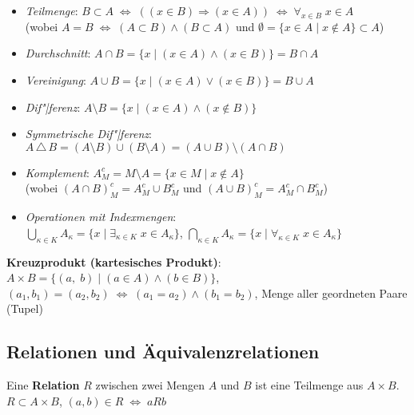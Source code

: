 \begin{itemize}
    \item \emph{Teilmenge}: $B \subset A \;\Leftrightarrow\;
    ((x \in B) \Rightarrow (x \in A)) \;\Leftrightarrow\;
    \forall_{x \in B}\; x \in A$
    \\ (wobei
    $A = B \;\Leftrightarrow\; (A \subset B) \land (B \subset A)$ und
    $\emptyset = \{x \in A \;|\; x \notin A\} \subset A$)
    
    \item \emph{Durchschnitt}:
    $A \cap B = \{x \;|\; (x \in A) \land (x \in B)\} = B \cap A$
    
    \item \emph{Vereinigung}: $A \cup B = \{x \;|\; (x \in A) \lor (x \in B)\}
    = B \cup A$
    
    \item \emph{Dif"|ferenz}: $A \setminus B = \{x \;|\; (x \in A) \land
    (x \notin B)\}$
    
    \item \emph{Symmetrische Dif"|ferenz}: $A \,\triangle\, B =
    (A \setminus B) \cup (B \setminus A) = (A \cup B) \setminus (A \cap B)$
    
    \item \emph{Komplement}:
    $A_M^c = M \setminus A = \{x \in M \;|\; x \notin A\}$ \\
    (wobei
    $(A \cap B)_M^c = A_M^c \cup B_M^c$ und
    $(A \cup B)_M^c = A_M^c \cap B_M^c$)
    
    \item \emph{Operationen mit Indexmengen}: \\
    $\bigcup_{\kappa \in K} A_\kappa =
    \{x \;|\; \exists_{\kappa \in K}\; x \in A_\kappa\}$,
    $\bigcap_{\kappa \in K} A_\kappa =
    \{x \;|\; \forall_{\kappa \in K}\; x \in A_\kappa\}$
\end{itemize}

\textbf{Kreuzprodukt (kartesisches Produkt)}:
$A \times B = \{(a,\; b) \;|\; (a \in A) \land (b \in B)\}$, \\
$(a_1, b_1) = (a_2, b_2) \;\Leftrightarrow\; (a_1 = a_2) \land (b_1 = b_2)$,
Menge aller geordneten Paare (Tupel)

\subsection{%
    Relationen und Äquivalenzrelationen%
}

Eine \textbf{Relation} $R$ zwischen zwei Mengen $A$ und $B$ ist eine Teilmenge
aus $A \times B$. \\
$R \subset A \times B$, $(a,b) \in R \;\Leftrightarrow\; a R b$

